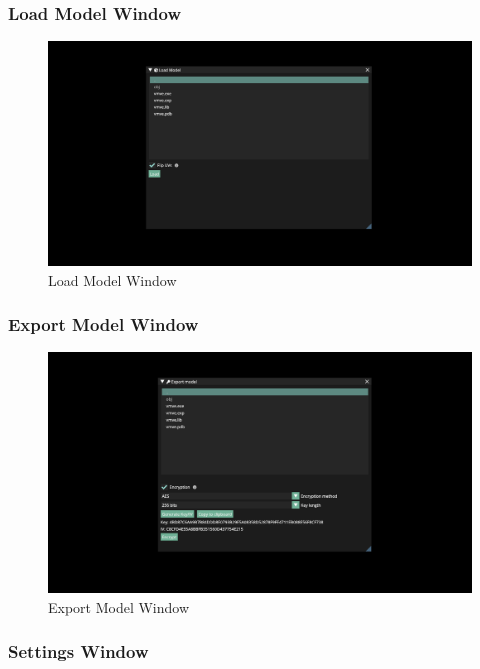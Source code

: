 \documentclass[11pt]{article}
\begin{document}
\subsubsection{Load Model Window}
\begin{figure}[h!]
  \centering
  \includegraphics[width=\textwidth]{images/load_model_window.png}
  \caption{Load Model Window}
  \label{fig:load_model_window}
\end{figure}


\subsubsection{Export Model Window}
\begin{figure}[h!]
  \centering
  \includegraphics[width=\textwidth]{images/encryption_system.png}
  \caption{Export Model Window}
  \label{fig:encryption_window}
\end{figure}

\subsubsection{Settings Window}
\end{document}
